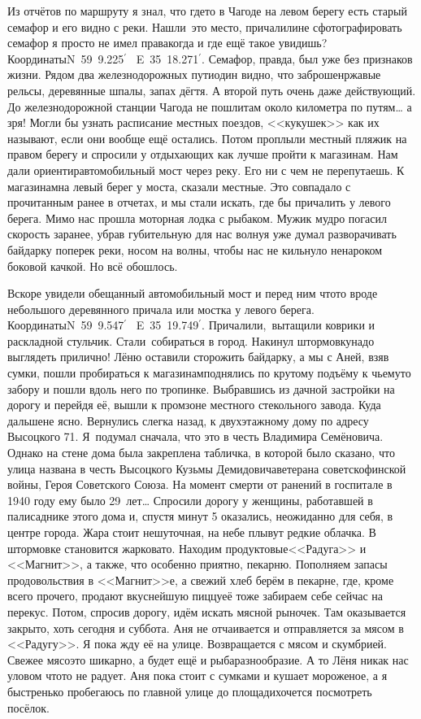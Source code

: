 Из отчётов по маршруту я знал, что где\sdash то в Чагоде на левом берегу есть старый семафор и его видно с реки. Нашли~это место, причалили\mdash не сфотографировать семафор я просто не имел права\mdash когда и где ещё такое увидишь? Координаты\mdash N~59\degree~9.225$^\prime$~ E~35\degree~18.271$^\prime$. Семафор, правда, был уже без признаков жизни. Рядом два железнодорожных пути\mdash один видно, что заброшен\mdash ржавые рельсы, деревянные шпалы, запах дёгтя. А второй путь очень даже действующий. До железнодорожной станции Чагода не пошли\mdash там около километра по путям… а зря! Могли бы узнать расписание местных поездов, <<кукушек>> как их называют, если они вообще ещё остались. 
\newpage
Потом проплыли местный пляжик на правом берегу и спросили у отдыхающих как лучше пройти к магазинам. Нам дали ориентир\mdash автомобильный мост через реку. Его ни с чем не перепутаешь. К магазинам\mdash на левый берег у моста, сказали местные. Это совпадало с прочитанным ранее в отчетах, и мы стали искать, где бы причалить у левого берега. Мимо нас прошла моторная лодка с рыбаком. Мужик мудро погасил скорость заранее, убрав губительную для нас волну\mdash я уже думал разворачивать байдарку поперек реки, носом на волны, чтобы нас не кильнуло ненароком боковой качкой. Но всё обошлось. 

Вскоре увидели обещанный автомобильный мост и перед ним что\sdash то вроде небольшого деревянного причала или мостка у левого берега. Координаты\mdash N~59\degree~9.547$^\prime$~ E~35\degree~19.749$^\prime$. Причалили,~вытащили коврики и раскладной стульчик. Стали~собираться в город. Накинул штормовку\mdash надо выглядеть прилично! Лёню оставили сторожить байдарку, а мы с Аней, взяв сумки, пошли пробираться к магазинам\mdash поднялись по крутому подъёму к чьему\sdash то забору и пошли вдоль него по тропинке. Выбравшись из дачной застройки на дорогу и перейдя её, вышли к промзоне местного стекольного завода. Куда дальше\mdash не ясно. Вернулись слегка назад, к двухэтажному дому по адресу Высоцкого 71. Я~подумал сначала, что это в честь Владимира Семёновича. Однако на стене дома была закреплена табличка, в которой было сказано, что улица названа в честь Высоцкого Кузьмы Демидовича\mdash ветерана советско\sdash финской войны, Героя Советского Союза. На момент смерти от ранений в госпитале в 1940 году ему было 29~лет\ldots 
\newpage
Спросили дорогу у женщины, работавшей в палисаднике этого дома и, спустя минут 5 оказались, неожиданно для себя, в центре города. Жара стоит нешуточная, на небе плывут редкие облачка. В штормовке становится жарковато. Находим продуктовые\mdash <<Радуга>> и <<Магнит>>, а также, что особенно приятно, пекарню. Пополняем запасы продовольствия в <<Магнит>>\sdash е, а свежий хлеб берём в пекарне, где, кроме всего прочего, продают вкуснейшую пиццу\mdash её тоже забираем себе сейчас на перекус. Потом, спросив дорогу, идём искать мясной рыночек. Там оказывается закрыто, хоть сегодня и суббота. Аня не отчаивается и отправляется за мясом в <<Радугу>>. Я пока жду её на улице. Возвращается с мясом и скумбрией. Свежее мясо\mdash это шикарно, а будет ещё и рыба\mdash разнообразие. А то Лёня никак нас уловом что\sdash то не радует. Аня пока стоит с сумками и кушает мороженое, а я быстренько пробегаюсь по главной улице до площади\mdash хочется посмотреть посёлок.

